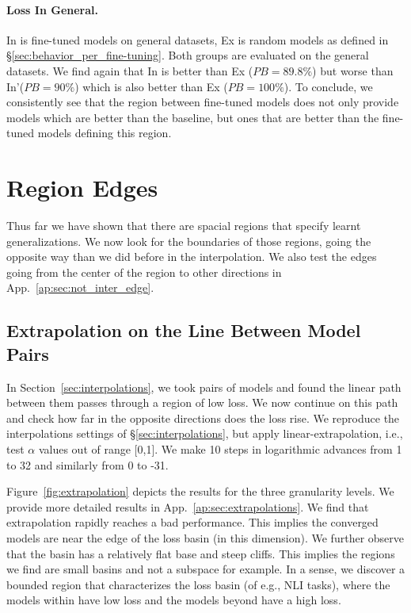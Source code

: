 \documentclass[nohyperref]{article}
\theoremstyle{plain}
\theoremstyle{definition}
\theoremstyle{remark}
\begin{document}
\paragraph{Loss In General.} In is fine-tuned models on {general} datasets, Ex is random models as defined in \S\ref{sec:behavior_per_fine-tuning}. Both groups are evaluated on the {general} datasets. 
We find again that In is better than Ex ($PB=89.8\%$) but worse than In'($PB=90\%$) which is also better than Ex ($PB=100\%$). To conclude, we consistently see that the region between fine-tuned models does not only provide models which are better than the baseline, but ones that are better than the fine-tuned models defining this region.



\section{Region Edges}\label{sec:boundaries}
Thus far we have shown that there are spacial regions that specify learnt generalizations. We now look for the boundaries of those regions, going the opposite way than we did before in the interpolation. 
We also test the edges going from the center of the region to other directions in App.~\ref{ap:sec:not_inter_edge}.

\subsection{Extrapolation on the Line Between Model Pairs}
In Section~\ref{sec:interpolations}, we took pairs of models and found the linear path between them passes through a region of low loss. We now continue on this path and check how far in the opposite directions does the loss rise. We reproduce the interpolations settings of \S\ref{sec:interpolations}, but apply linear-extrapolation, i.e., test $ \alpha $ values out of range [0,1]. We make 10 steps in logarithmic advances from 1 to 32 and similarly from 0 to -31.%


Figure~\ref{fig:extrapolation} depicts the results for the three granularity levels. We provide more detailed results in App.~\ref{ap:sec:extrapolations}. We find that extrapolation rapidly reaches a bad performance. This implies the converged models are near the edge of the loss basin (in this dimension). We further observe that the basin has a relatively flat base and steep cliffs. This implies the regions we find are small basins and not a subspace for example. In a sense, we discover a bounded region that characterizes the loss basin (of e.g., NLI tasks), where the models within have low loss and the models beyond have a high loss.  
\end{document}
